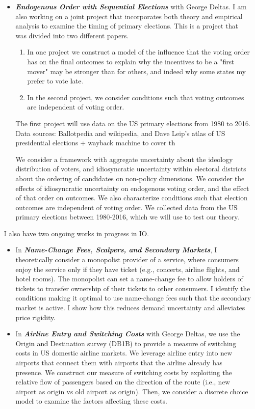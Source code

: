 \documentclass[12pt]{article}
\theoremstyle{plain}
\theoremstyle{plain}
\theoremstyle{plain}
\theoremstyle{plain}
\theoremstyle{plain}
\theoremstyle{plain}
\begin{document}
\begin{itemize}
\item \emph{\textbf{Endogenous Order with Sequential Elections}}  with George Deltas.
I am also working on a joint project that incorporates both theory and empirical analysis to examine the timing of primary elections.
This is a project that was divided into two different papers.
\begin{enumerate}
\item In one project we construct a model of the influence that the voting order has on the final outcomes to explain why the incentives to be a "first mover" may be stronger than for others, and indeed why some states my prefer to vote late.
\item In the second project, we consider conditions  such that voting outcomes are independent of voting order.
\end{enumerate}
The first project will use data on the US primary elections from 1980 to 2016.
Data sources: Ballotpedia and wikipedia, and Dave Leip's atlas of US presidential elections + wayback machine to cover th

We consider a framework with aggregate uncertainty about the ideology distribution of voters, and
idiosyncratic uncertainty within electoral districts about the ordering of candidates on non-policy dimensions.
We consider the effects of idiosyncratic uncertainty on endogenous voting order, and the effect of that order on outcomes.
We also characterize conditions such that election outcomes are independent of voting order.
We collected data from the US primary elections between 1980-2016, which we will use to test our theory.
\end{itemize}


I also have two ongoing works in progress in IO.

\begin{itemize}
\item In \emph{\textbf{Name-Change Fees, Scalpers, and Secondary Markets}},
I theoretically consider a monopolist provider of a service, where consumers enjoy the service only if they have ticket (e.g., concerts, airline flights, and hotel rooms).
The monopolist can set a name-change fee to allow holders of tickets to transfer ownership of their tickets to other consumers.
I identify the conditions making it optimal to use name-change fees  such that the secondary market is active. I show how this reduces demand uncertainty and alleviates price rigidity.
\end{itemize}


\begin{itemize}
\item In \emph{\textbf{Airline Entry and Switching Costs}} with George Deltas,
we use the Origin and Destination survey (DB1B) to provide a measure of switching costs in US domestic airline markets.
We leverage airline entry into new airports that connect them with airports that the airline already has presence.
We construct our measure of switching costs by exploiting the relative flow of passengers based on the direction of the route (i.e., new airport as origin vs old airport as origin).
Then, we consider a discrete choice model to examine the factors affecting these costs.
\end{itemize}
\end{document}
